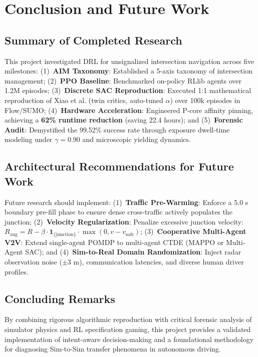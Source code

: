 \chapter{Conclusion and Future Work}
\label{ch:conclusion}

\section{Summary of Completed Research}
This project investigated DRL for unsignalized intersection navigation across five milestones: (1)~\textbf{AIM Taxonomy}: Established a 5-axis taxonomy of intersection management; (2)~\textbf{PPO Baseline}: Benchmarked on-policy RLlib agents over 1.2M episodes; (3)~\textbf{Discrete SAC Reproduction}: Executed 1:1 mathematical reproduction of Xiao et al. \cite{xiao2024decision} (twin critics, auto-tuned $\alpha$) over 100k episodes in Flow/SUMO; (4)~\textbf{Hardware Acceleration}: Engineered P-core affinity pinning, achieving a \textbf{62\% runtime reduction} (saving 22.4 hours); and (5)~\textbf{Forensic Audit}: Demystified the 99.52\% success rate through exposure dwell-time modeling under $\gamma=0.90$ and microscopic yielding dynamics.

\vspace{-0.2cm}
\section{Architectural Recommendations for Future Work}
Future research should implement: (1)~\textbf{Traffic Pre-Warming}: Enforce a 5.0 s boundary pre-fill phase to ensure dense cross-traffic actively populates the junction; (2)~\textbf{Velocity Regularization}: Penalize excessive junction velocity: $R_{\text{aug}} = R - \beta \cdot \mathbf{1}_{\{\text{junction}\}} \cdot \max(0, v - v_{\text{safe}})$; (3)~\textbf{Cooperative Multi-Agent V2V}: Extend single-agent POMDP to multi-agent CTDE (MAPPO or Multi-Agent SAC); and (4)~\textbf{Sim-to-Real Domain Randomization}: Inject radar observation noise ($\pm 3$ m), communication latencies, and diverse human driver profiles.

\vspace{-0.2cm}
\section{Concluding Remarks}
By combining rigorous algorithmic reproduction with critical forensic analysis of simulator physics and RL specification gaming, this project provides a validated implementation of intent-aware decision-making and a foundational methodology for diagnosing Sim-to-Sim transfer phenomena in autonomous driving.


